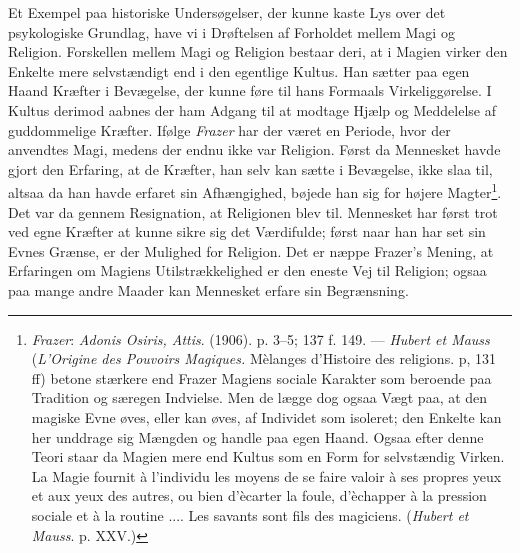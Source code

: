 \documentclass[12pt,a4paper]{book}
\newcommand{\apage}[1]{\marginnote{\footnotesize\textit{[#1]}}}
\begin{document}
Et Exempel paa historiske Undersøgelser, der kunne kaste Lys over det psykologiske Grundlag,
have vi i Drøftelsen af Forholdet mellem Magi og Religion. Forskellen mellem Magi og Religion
bestaar deri, at i Magien virker den Enkelte mere selvstændigt end i den egentlige Kultus.
Han sætter paa egen Haand Kræfter i Bevægelse, der kunne føre til hans Formaals
Virkeliggørelse. I Kultus derimod aabnes der ham Adgang til at modtage Hjælp og Meddelelse af
guddommelige Kræfter. Ifølge \emph{Frazer} har der været en Periode, hvor der anvendtes Magi,
medens der endnu ikke var Religion. Først da Mennesket havde gjort den Erfaring, \apage{390} at de
Kræfter, han selv kan sætte i Bevægelse, ikke slaa til, altsaa da han havde erfaret sin
Afhængighed, bøjede han sig for højere Magter\footnote{\emph{Frazer}: \emph{Adonis Osiris,
Attis}. (1906). p. 3--5; 137 f. 149. --- \emph{Hubert et Mauss} (\emph{L'Origine des Pouvoirs Magiques.} Mèlanges d'Histoire des religions. p, 131 ff) betone stærkere end Frazer Magiens
sociale Karakter som beroende paa Tradition og særegen Indvielse. Men de lægge dog ogsaa Vægt
paa, at den magiske Evne øves, eller kan øves, af Individet som isoleret; den Enkelte kan her
unddrage sig Mængden og handle paa egen Haand. Ogsaa efter denne Teori staar da Magien mere
end Kultus som en Form for selvstændig Virken. La Magie fournit à l'individu les moyens de se
faire valoir à ses propres yeux et aux yeux des autres, ou bien d'ècarter la foule,
d'èchapper à la pression sociale et à la routine .... Les savants sont fils des magiciens.
(\emph{Hubert et Mauss}. p. XXV.)}. Det var da gennem Resignation, at Religionen blev til.
Mennesket har først trot ved egne Kræfter at kunne sikre sig det Værdifulde; først naar han
har set sin Evnes Grænse, er der Mulighed for Religion. Det er næppe Frazer's Mening, at
Erfaringen om Magiens Utilstrækkelighed er den eneste Vej til Religion; ogsaa paa mange andre
Maader kan Mennesket erfare sin Begrænsning.
\end{document}
